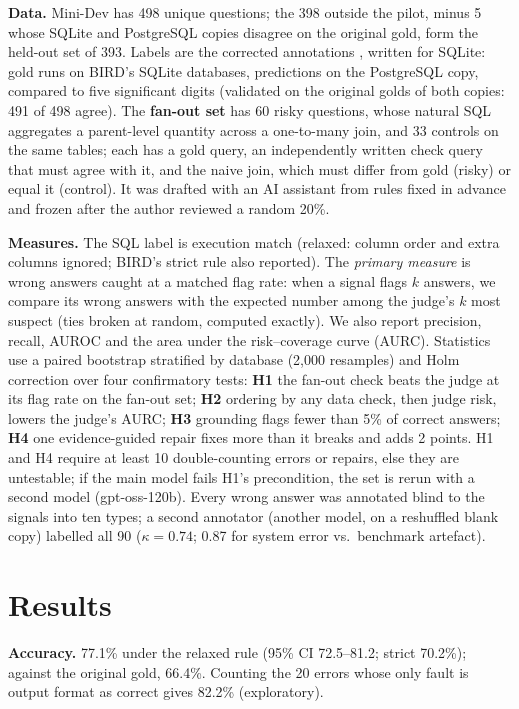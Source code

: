 \documentclass[10pt,twocolumn]{article}
\begin{document}
\textbf{Data.} Mini-Dev has 498 unique questions; the 398 outside the pilot, minus 5 whose SQLite and
PostgreSQL copies disagree on the original gold, form the held-out set of 393. Labels are the
corrected annotations \citep{jin2026annotation}, written for SQLite: gold runs on BIRD's SQLite
databases, predictions on the PostgreSQL copy, compared to five significant digits (validated on the
original golds of both copies: 491 of 498 agree). The \textbf{fan-out set} has 60 risky questions,
whose natural SQL aggregates a parent-level quantity across a one-to-many join, and 33 controls on the
same tables; each has a gold query, an independently written check query that must agree with it, and
the naive join, which must differ from gold (risky) or equal it (control). It was drafted with an AI
assistant from rules fixed in advance and frozen after the author reviewed a random 20\%.

\textbf{Measures.} The SQL label is execution match (relaxed: column order and extra columns ignored;
BIRD's strict rule also reported). The \emph{primary measure} is wrong answers caught at a matched
flag rate: when a signal flags $k$ answers, we compare its wrong answers with the expected number among
the judge's $k$ most suspect (ties broken at random, computed exactly). We also report precision,
recall, AUROC and the area under the risk--coverage curve (AURC). Statistics use a paired bootstrap
stratified by database (2,000 resamples) and Holm correction over four confirmatory tests: \textbf{H1}
the fan-out check beats the judge at its flag rate on the fan-out set; \textbf{H2} ordering by any
data check, then judge risk, lowers the judge's AURC; \textbf{H3} grounding flags fewer than 5\% of
correct answers; \textbf{H4} one evidence-guided repair fixes more than it breaks and adds 2 points.
H1 and H4 require at least 10 double-counting errors or repairs, else they are untestable; if the main
model fails H1's precondition, the set is rerun with a second model (gpt-oss-120b). Every wrong answer
was annotated blind to the signals into ten types; a second annotator (another model, on a reshuffled
blank copy) labelled all 90 ($\kappa=0.74$; 0.87 for system error vs.\ benchmark artefact).

\section{Results}

\textbf{Accuracy.} 77.1\% under the relaxed rule (95\% CI 72.5--81.2; strict 70.2\%); against the
original gold, 66.4\%. Counting the 20 errors whose only fault is output format as correct gives
82.2\% (exploratory).
\end{document}
